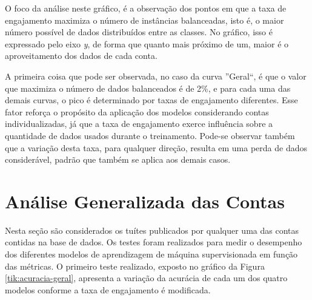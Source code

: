 \documentclass[oneside,openright,12pt]{ufsm_2015} %
\begin{document}
    \par O foco da análise neste gráfico, é a observação dos pontos em que a taxa de engajamento maximiza o número de instâncias balanceadas, isto é, o maior número possível de dados distribuídos entre as classes. No gráfico, isso é expressado pelo eixo \textit{y}, de forma que quanto mais próximo de um, maior é o aproveitamento dos dados de cada conta.
    
    \par A primeira coisa que pode ser observada, no caso da curva ''Geral``, é que o valor que maximiza o número de dados balanceados é de 2\%, e para cada uma das demais curvas, o pico é determinado por taxas de engajamento diferentes. Esse fator reforça o propósito da aplicação dos modelos considerando contas individualizadas, já que a taxa de engajamento exerce influência sobre a quantidade de dados usados durante o treinamento. Pode-se observar também que a variação desta taxa, para qualquer direção, resulta em uma perda de dados considerável, padrão que também se aplica aos demais casos.
    

\section{Análise Generalizada das Contas}
\label{sec:exp-analise-geral}
    
    \par Nesta seção são considerados os tuítes publicados por qualquer uma das contas contidas na base de dados. Os testes foram realizados para medir o desempenho dos diferentes modelos de aprendizagem de máquina supervisionada em função das métricas. O primeiro teste realizado, exposto no gráfico da Figura \ref{tik:acuracia-geral}, apresenta a variação da acurácia de cada um dos quatro modelos conforme a taxa de engajamento é modificada.
    
    \mydata
    
\end{document}
